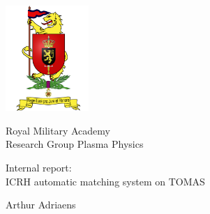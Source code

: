 

\begin{titlepage}


\fontsize{12pt}{14pt}
\selectfont

\begin{center}

\includegraphics[height=4cm]{figures/ruglogo.pdf}

\vspace{0.5cm}

Royal Military Academy\\
Research Group Plasma Physics

\vspace{3.5cm}

\fontsize{17.28pt}{21pt}
\selectfont
Internal report:\\
ICRH automatic matching system on TOMAS

\fontsize{12pt}{14pt}
\selectfont

\vspace{.6cm}


\vspace{.4cm}

Arthur Adriaens

\vspace{3.5cm}

\end{center}
\end{titlepage}

